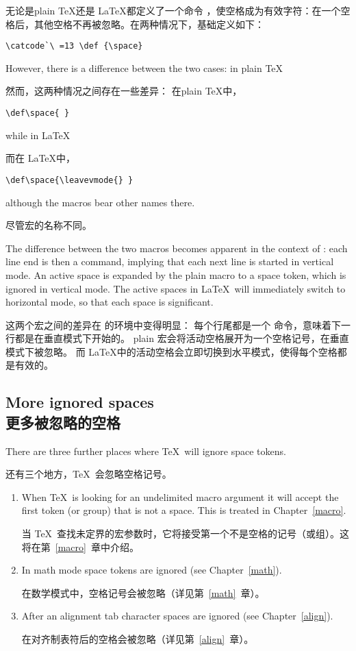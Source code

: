 无论是plain \TeX 还是 \LaTeX 都定义了一个命令 ，使空格成为有效字符：在一个空格后，其他空格不再被忽略。在两种情况下，基础定义如下：
\altt
\begin{verbatim}
\catcode`\ =13 \def {\space}
\end{verbatim}
However, there is a difference between the two cases:
in plain \TeX\ 

然而，这两种情况之间存在一些差异：
在plain \TeX 中，
\begin{verbatim}
\def\space{ }
\end{verbatim}
while in \LaTeX\ 

而在 \LaTeX 中，
\begin{verbatim}
\def\space{\leavevmode{} }
\end{verbatim}
although the macros bear other names there.

尽管宏的名称不同。


The difference between the two macros becomes
apparent in the context of :
each line end is then a  command, implying that
each next line is started in vertical mode.
An active space is expanded by the plain macro to a space token, 
which is ignored in vertical mode.
The active spaces in \LaTeX\ will immediately switch to horizontal
mode, so that each space is significant.

这两个宏之间的差异在  的环境中变得明显：
每个行尾都是一个  命令，意味着下一行都是在垂直模式下开始的。
plain 宏会将活动空格展开为一个空格记号，在垂直模式下被忽略。
而 \LaTeX 中的活动空格会立即切换到水平模式，使得每个空格都是有效的。



\subsection{More ignored spaces\\更多被忽略的空格}

There are three further places where \TeX\ will ignore space tokens.
\alt

还有三个地方，\TeX\ 会忽略空格记号。
\begin{enumerate}
\item When \TeX\ is looking for
an undelimited macro argument it will accept the
first token (or group) that is not a space. This is treated
in Chapter~\ref{macro}.

当 \TeX\ 查找未定界的宏参数时，它将接受第一个不是空格的记号（或组）。这将在第~\ref{macro}~章中介绍。
\item In math mode space tokens are ignored (see Chapter~\ref{math}).

在数学模式中，空格记号会被忽略（详见第~\ref{math}~章）。
\item After an alignment tab character spaces are ignored
(see Chapter~\ref{align}).

在对齐制表符后的空格会被忽略（详见第~\ref{align}~章）。
\end{enumerate}
\awp

